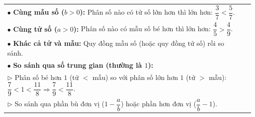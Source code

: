 \documentclass[14pt,a4paper,oneside]{extbook}
\begin{document}
\vspace{3mm}

\noindent
\begin{tcolorbox}[
  enhanced,
  title={\footnotesize\bfseries\color{white}\faBalanceScale\ 3. Bốn phương pháp so sánh phân số},
  colback=purple!2!white,
  colframe=purple!70!black,
  arc=2.5mm, boxrule=0.8pt, top=1.8mm, bottom=1.8mm, left=2.5mm, right=2.5mm
]
  \footnotesize
  \begin{tabular}{ll}
    $\bullet$ \textbf{Cùng mẫu số ($b>0$):} Phân số nào có tử số lớn hơn thì lớn hơn: $\dfrac{3}{7} < \dfrac{5}{7}$.\\
    $\bullet$ \textbf{Cùng tử số ($a>0$):} Phân số nào có mẫu số bé hơn thì lớn hơn: $\dfrac{4}{5} > \dfrac{4}{9}$.\\
    $\bullet$ \textbf{Khác cả tử và mẫu:} Quy đồng mẫu số (hoặc quy đồng tử số) rồi so sánh.\\
    $\bullet$ \textbf{So sánh qua số trung gian (thường là $1$):}\\
    \quad $\triangleright$ Phân số bé hơn $1$ (tử $<$ mẫu) so với phân số lớn hơn $1$ (tử $>$ mẫu): $\dfrac{7}{9} < 1 < \dfrac{11}{8} \Rightarrow \dfrac{7}{9} < \dfrac{11}{8}$.\\
    \quad $\triangleright$ So sánh qua phần bù đơn vị ($1 - \dfrac{a}{b}$) hoặc phần hơn đơn vị ($\dfrac{a}{b} - 1$).
  \end{tabular}
\end{tcolorbox}

\vspace{3mm}
\end{document}

